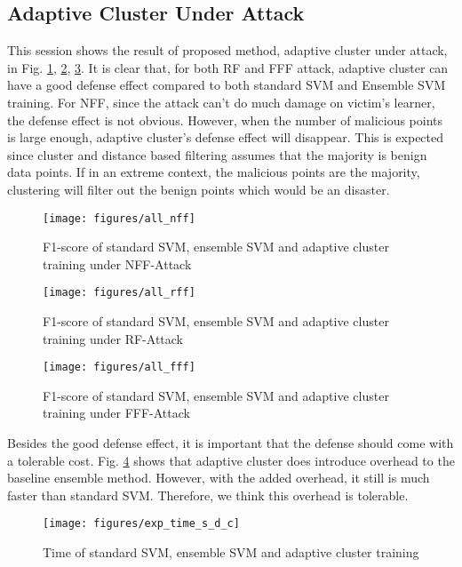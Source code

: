 \documentclass[10pt,conference,compsocconf,letterpaper]{IEEEtran}
\begin{document}
\subsection{Adaptive Cluster Under Attack}
This session shows the result of proposed method, adaptive cluster under attack, in Fig. \ref{fig:all_nff}, \ref{fig:all_rff}, \ref{fig:all_fff}. It is clear that, for both RF and FFF attack, adaptive cluster can have a good defense effect compared to both standard SVM and Ensemble SVM training. For NFF, since the attack can't do much damage on victim's learner, the defense effect is not obvious. However, when the number of malicious points is large enough, adaptive cluster's defense effect will disappear. This is expected since cluster and distance based filtering assumes that the majority is benign data points. If in an extreme context, the malicious points are the majority, clustering will filter out the benign points which would be an disaster. 


\begin{figure}[h]
  \centering
  \label{fig:all_nff}
  \texttt{[image: figures/all\_nff]}
  \caption{F1-score of standard SVM, ensemble SVM and adaptive cluster training under NFF-Attack}
\end{figure}
\begin{figure}[h]
  \centering
  \label{fig:all_rff}
  \texttt{[image: figures/all\_rff]}
  \caption{F1-score of standard SVM, ensemble SVM and adaptive cluster training under RF-Attack}
\end{figure}
\begin{figure}[h]
  \centering
  \label{fig:all_fff}
  \texttt{[image: figures/all\_fff]}
  \caption{F1-score of standard SVM, ensemble SVM and adaptive cluster training under FFF-Attack}
\end{figure}

Besides the good defense effect, it is important that the defense should come with a tolerable cost. Fig. \ref{fig:exp_time_s_d_c} shows that adaptive cluster does introduce overhead to the baseline ensemble method. However, with the added overhead, it still is much faster than standard SVM. Therefore, we think this overhead is tolerable.


\begin{figure}[h]
  \centering
  \label{fig:exp_time_s_d_c}
  \texttt{[image: figures/exp\_time\_s\_d\_c]}
  \caption{Time of standard SVM, ensemble SVM and adaptive cluster training}
\end{figure}
\end{document}
